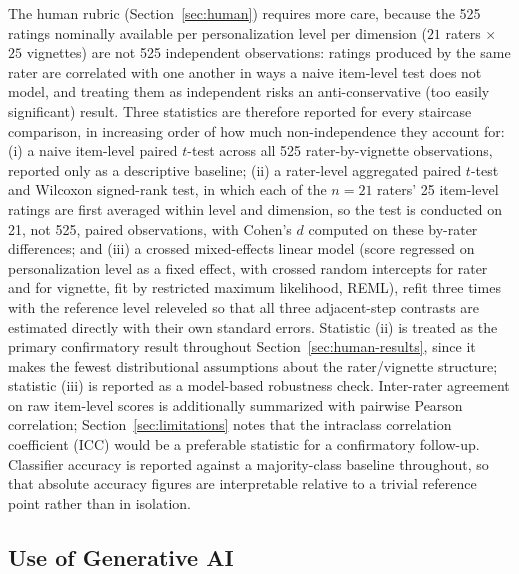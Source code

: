 \documentclass[higheredu,article,submit,pdftex,moreauthors]{Definitions/mdpi}
\begin{document}
The human rubric (Section~\ref{sec:human}) requires more care, because the 525 ratings nominally available per personalization level per dimension ($21$ raters $\times$ $25$ vignettes) are not 525 independent observations: ratings produced by the same rater are correlated with one another in ways a naive item-level test does not model, and treating them as independent risks an anti-conservative (too easily significant) result. Three statistics are therefore reported for every staircase comparison, in increasing order of how much non-independence they account for: (i) a naive item-level paired $t$-test across all 525 rater-by-vignette observations, reported only as a descriptive baseline; (ii) a rater-level aggregated paired $t$-test and Wilcoxon signed-rank test, in which each of the $n=21$ raters' 25 item-level ratings are first averaged within level and dimension, so the test is conducted on 21, not 525, paired observations, with Cohen's $d$ computed on these by-rater differences; and (iii) a crossed mixed-effects linear model (score regressed on personalization level as a fixed effect, with crossed random intercepts for rater and for vignette, fit by restricted maximum likelihood, REML), refit three times with the reference level releveled so that all three adjacent-step contrasts are estimated directly with their own standard errors. Statistic (ii) is treated as the primary confirmatory result throughout Section~\ref{sec:human-results}, since it makes the fewest distributional assumptions about the rater/vignette structure; statistic (iii) is reported as a model-based robustness check. Inter-rater agreement on raw item-level scores is additionally summarized with pairwise Pearson correlation; Section~\ref{sec:limitations} notes that the intraclass correlation coefficient (ICC) would be a preferable statistic for a confirmatory follow-up. Classifier accuracy is reported against a majority-class baseline throughout, so that absolute accuracy figures are interpretable relative to a trivial reference point rather than in isolation.

\subsection{Use of Generative AI}
\end{document}
